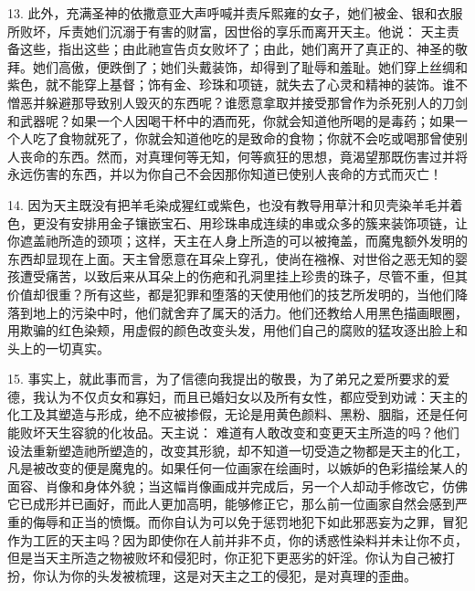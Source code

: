 13. 此外，充满圣神的依撒意亚大声呼喊并责斥熙雍的女子，她们被金、银和衣服所败坏，斥责她们沉溺于有害的财富，因世俗的享乐而离开天主。他说：  天主责备这些，指出这些；由此祂宣告贞女败坏了；由此，她们离开了真正的、神圣的敬拜。她们高傲，便跌倒了；她们头戴装饰，却得到了耻辱和羞耻。她们穿上丝绸和紫色，就不能穿上基督；饰有金、珍珠和项链，就失去了心灵和精神的装饰。谁不憎恶并躲避那导致别人毁灭的东西呢？谁愿意拿取并接受那曾作为杀死别人的刀剑和武器呢？如果一个人因喝干杯中的酒而死，你就会知道他所喝的是毒药；如果一个人吃了食物就死了，你就会知道他吃的是致命的食物；你就不会吃或喝那曾使别人丧命的东西。然而，对真理何等无知，何等疯狂的思想，竟渴望那既伤害过并将永远伤害的东西，并以为你自己不会因那你知道已使别人丧命的方式而灭亡！\par

14. 因为天主既没有把羊毛染成猩红或紫色，也没有教导用草汁和贝壳染羊毛并着色，更没有安排用金子镶嵌宝石、用珍珠串成连续的串或众多的簇来装饰项链，让你遮盖祂所造的颈项；这样，天主在人身上所造的可以被掩盖，而魔鬼额外发明的东西却显现在上面。天主曾愿意在耳朵上穿孔，使尚在襁褓、对世俗之恶无知的婴孩遭受痛苦，以致后来从耳朵上的伤疤和孔洞里挂上珍贵的珠子，尽管不重，但其价值却很重？所有这些，都是犯罪和堕落的天使用他们的技艺所发明的，当他们降落到地上的污染中时，他们就舍弃了属天的活力。他们还教给人用黑色描画眼圈，用欺骗的红色染颊，用虚假的颜色改变头发，用他们自己的腐败的猛攻逐出脸上和头上的一切真实。\par

15. 事实上，就此事而言，为了信德向我提出的敬畏，为了弟兄之爱所要求的爱德，我认为不仅贞女和寡妇，而且已婚妇女以及所有女性，都应受到劝诫：天主的化工及其塑造与形成，绝不应被掺假，无论是用黄色颜料、黑粉、胭脂，还是任何能败坏天生容貌的化妆品。天主说： 难道有人敢改变和变更天主所造的吗？他们设法重新塑造祂所塑造的，改变其形貌，却不知道一切受造之物都是天主的化工，凡是被改变的便是魔鬼的。如果任何一位画家在绘画时，以嫉妒的色彩描绘某人的面容、肖像和身体外貌；当这幅肖像画成并完成后，另一个人却动手修改它，仿佛它已成形并已画好，而此人更加高明，能够修正它，那么前一位画家自然会感到严重的侮辱和正当的愤慨。而你自认为可以免于惩罚地犯下如此邪恶妄为之罪，冒犯作为工匠的天主吗？因为即使你在人前并非不贞，你的诱惑性染料并未让你不贞，但是当天主所造之物被败坏和侵犯时，你正犯下更恶劣的奸淫。你认为自己被打扮，你认为你的头发被梳理，这是对天主之工的侵犯，是对真理的歪曲。\par


